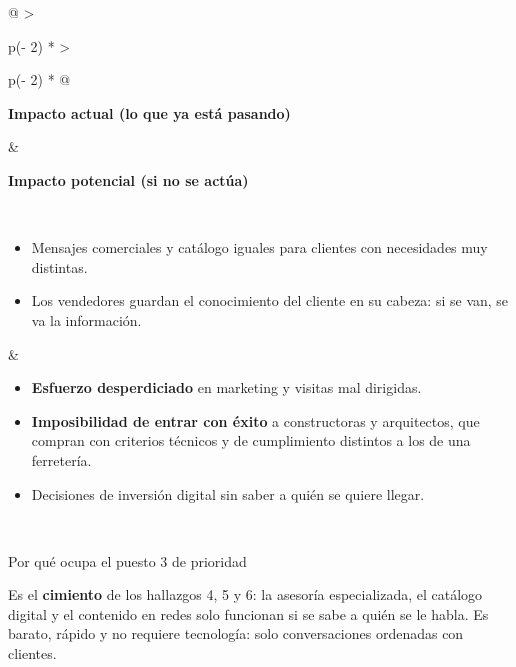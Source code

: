 \documentclass[11pt,a4paper]{article}
\begin{document}
\begin{longtable}[]{@{}
  >{\raggedright\arraybackslash}p{(\columnwidth - 2\tabcolsep) * }
  >{\raggedright\arraybackslash}p{(\columnwidth - 2\tabcolsep) * }@{}}
\toprule\noalign{}
\begin{minipage}[b]{\linewidth}\raggedright
\textbf{Impacto actual (lo que ya está pasando)}
\end{minipage} & \begin{minipage}[b]{\linewidth}\raggedright
\textbf{Impacto potencial (si no se actúa)}
\end{minipage} \\
\midrule\noalign{}
\endfirsthead
\bottomrule\noalign{}
\endlastfoot
\begin{minipage}[t]{\linewidth}\raggedright
\begin{itemize}
\item
  Mensajes comerciales y catálogo iguales para clientes con necesidades muy distintas.
\item
  Los vendedores guardan el conocimiento del cliente en su cabeza: si se van, se va la información.
\end{itemize}
\end{minipage} & \begin{minipage}[t]{\linewidth}\raggedright
\begin{itemize}
\item
  \textbf{Esfuerzo desperdiciado} en marketing y visitas mal dirigidas.
\item
  \textbf{Imposibilidad de entrar con éxito} a constructoras y arquitectos, que compran con
  criterios técnicos y de cumplimiento distintos a los de una ferretería.
\item
  Decisiones de inversión digital sin saber a quién se quiere llegar.
\end{itemize}
\end{minipage} \\
\end{longtable}

\begin{cajaaviso}{Por qué ocupa el puesto 3 de prioridad}

Es el \textbf{cimiento} de los hallazgos 4, 5 y 6: la asesoría especializada, el catálogo digital y
el contenido en redes solo funcionan si se sabe a quién se le habla. Es barato, rápido y no requiere
tecnología: solo conversaciones ordenadas con clientes.

\end{cajaaviso}
\end{document}

